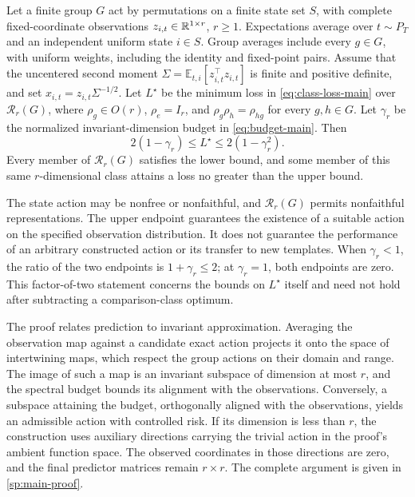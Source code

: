 \begin{spectraltheorem}
\label{sp:main}
Let a finite group $G$ act by permutations on a finite state
set $S$, with complete fixed-coordinate observations
$z_{i,t}\in\mathbb{R}^{1\times r}$, $r\ge1$.
Expectations average over $t\sim P_T$ and an independent
uniform state $i\in S$.
Group averages include every $g\in G$, with uniform weights,
including the identity and fixed-point pairs.
Assume that the uncentered second moment
$\Sigma=\mathbb E_{t,i}[z_{i,t}^{\top}z_{i,t}]$
is finite and positive definite, and set
$x_{i,t}=z_{i,t}\Sigma^{-1/2}$.
Let $L^\star$ be the minimum loss in
\cref{eq:class-loss-main} over $\mathcal R_r(G)$, where
$\rho_g\in O(r)$, $\rho_e=I_r$, and
$\rho_g\rho_h=\rho_{hg}$ for every $g,h\in G$.
Let $\gamma_r$ be the normalized invariant-dimension budget
in \cref{eq:budget-main}.
Then
\begin{equation}
 \boxed{2(1-\gamma_r)\le L^\star\le2(1-\gamma_r^2).}
 \label{eq:main-risk-bound}
\end{equation}
Every member of $\mathcal R_r(G)$ satisfies the lower bound,
and some member of this same $r$-dimensional class attains
a loss no greater than the upper bound.
\end{spectraltheorem}

The state action may be nonfree or nonfaithful, and
$\mathcal R_r(G)$ permits nonfaithful representations.
The upper endpoint guarantees the existence of a suitable
action on the specified observation distribution.
It does not guarantee the performance of an arbitrary
constructed action or its transfer to new templates.
When $\gamma_r<1$, the ratio of the two endpoints is
$1+\gamma_r\le2$; at $\gamma_r=1$, both endpoints are zero.
This factor-of-two statement concerns the bounds on
$L^\star$ itself and need not hold after subtracting a
comparison-class optimum.

The proof relates prediction to invariant approximation.
Averaging the observation map against a candidate exact
action projects it onto the space of intertwining maps,
which respect the group actions on their domain and range.
The image of such a map is an invariant subspace of
dimension at most $r$, and the spectral budget bounds its
alignment with the observations.
Conversely, a subspace attaining the budget, orthogonally
aligned with the observations, yields an admissible action
with controlled risk.
If its dimension is less than $r$, the construction uses
auxiliary directions carrying the trivial action in the
proof's ambient function space.
The observed coordinates in those directions are zero,
and the final predictor matrices remain $r\times r$.
The complete argument is given in \cref{sp:main-proof}.

